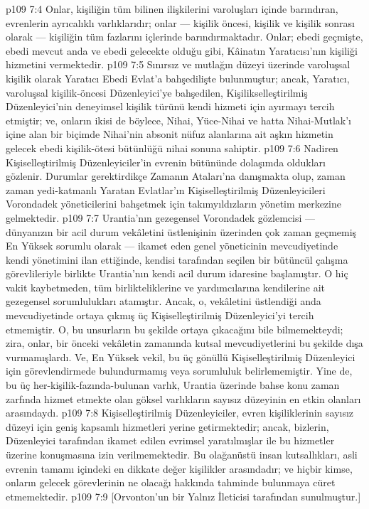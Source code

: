 \vs p109 7:4 Onlar, kişiliğin tüm bilinen ilişkilerini varoluşları içinde barındıran, evrenlerin ayrıcalıklı varlıklarıdır; onlar --- kişilik öncesi, kişilik ve kişilik sonrası olarak --- kişiliğin tüm fazlarını içlerinde barındırmaktadır. Onlar; ebedi geçmişte, ebedi mevcut anda ve ebedi gelecekte olduğu gibi, Kâinatın Yaratıcısı’nın kişiliği hizmetini vermektedir.
\vs p109 7:5 Sınırsız ve mutlağın düzeyi üzerinde varoluşsal kişilik olarak Yaratıcı Ebedi Evlat’a bahşedilişte bulunmuştur; ancak, Yaratıcı, varoluşsal kişilik\hyp{}öncesi Düzenleyici’ye bahşedilen, Kişilikselleştirilmiş Düzenleyici’nin deneyimsel kişilik türünü kendi hizmeti için ayırmayı tercih etmiştir; ve, onların ikisi de böylece, Nihai, Yüce\hyp{}Nihai ve hatta Nihai\hyp{}Mutlak’ı içine alan bir biçimde Nihai’nin absonit nüfuz alanlarına ait aşkın hizmetin gelecek ebedi kişilik\hyp{}ötesi bütünlüğü nihai sonuna sahiptir.
\vs p109 7:6 Nadiren Kişiselleştirilmiş Düzenleyiciler’in evrenin bütününde dolaşımda oldukları gözlenir. Durumlar gerektirdikçe Zamanın Ataları’na danışmakta olup, zaman zaman yedi\hyp{}katmanlı Yaratan Evlatlar’ın Kişiselleştirilmiş Düzenleyicileri Vorondadek yöneticilerini bahşetmek için takımyıldızların yönetim merkezine gelmektedir.
\vs p109 7:7 Urantia’nın gezegensel Vorondadek gözlemcisi --- dünyanızın bir acil durum vekâletini üstlenişinin üzerinden çok zaman geçmemiş En Yüksek sorumlu olarak --- ikamet eden genel yöneticinin mevcudiyetinde kendi yönetimini ilan ettiğinde, kendisi tarafından seçilen bir bütüncül çalışma görevlileriyle birlikte Urantia’nın kendi acil durum idaresine başlamıştır. O hiç vakit kaybetmeden, tüm birlikteliklerine ve yardımcılarına kendilerine ait gezegensel sorumlulukları atamıştır. Ancak, o, vekâletini üstlendiği anda mevcudiyetinde ortaya çıkmış üç Kişiselleştirilmiş Düzenleyici’yi tercih etmemiştir. O, bu unsurların bu şekilde ortaya çıkacağını bile bilmemekteydi; zira, onlar, bir önceki vekâletin zamanında kutsal mevcudiyetlerini bu şekilde dışa vurmamışlardı. Ve, En Yüksek vekil, bu üç gönüllü Kişiselleştirilmiş Düzenleyici için görevlendirmede bulundurmamış veya sorumluluk belirlememiştir. Yine de, bu üç her\hyp{}kişilik\hyp{}fazında\hyp{}bulunan varlık, Urantia üzerinde bahse konu zaman zarfında hizmet etmekte olan göksel varlıkların sayısız düzeyinin en etkin olanları arasındaydı.
\vs p109 7:8 Kişiselleştirilmiş Düzenleyiciler, evren kişiliklerinin sayısız düzeyi için geniş kapsamlı hizmetleri yerine getirmektedir; ancak, bizlerin, Düzenleyici tarafından ikamet edilen evrimsel yaratılmışlar ile bu hizmetler üzerine konuşmasına izin verilmemektedir. Bu olağanüstü insan kutsallıkları, asli evrenin tamamı içindeki en dikkate değer kişilikler arasındadır; ve hiçbir kimse, onların gelecek görevlerinin ne olacağı hakkında tahminde bulunmaya cüret etmemektedir.
\vs p109 7:9 [Orvonton’un bir Yalnız İleticisi tarafından sunulmuştur.]

